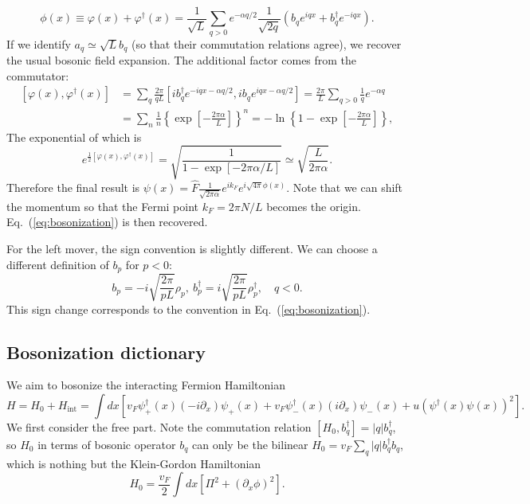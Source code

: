 \documentclass[aps,prb,superscriptaddress,nofootinbib]{revtex4}
\begin{document}
\begin{equation}
	\phi(x) \equiv \varphi(x)+\varphi^\dagger(x)= \frac{1}{\sqrt{L}} \sum_{q>0} e^{-\alpha q/2} \frac{1}{\sqrt{2q}} \left(b_q e^{iqx} + b_q^\dagger e^{-iqx} \right).
\end{equation}
If we identify $a_q \simeq \sqrt{L}b_q$ (so that their commutation relations agree), we recover the usual bosonic field expansion.
The additional factor comes from the commutator:
\begin{equation*}
\begin{aligned}
	\left[\varphi(x),\varphi^\dagger(x)\right] &= \sum_q \frac{2\pi}{qL} [i b_q^\dagger e^{-iqx-\alpha q/2}, i b_q e^{iqx-\alpha q/2}] 
	= \frac{2\pi}{L} \sum_{q>0} \frac{1}{q} e^{-\alpha q} \\
	&= \sum_n \frac{1}{n}\left\{\exp\left[-\frac{2\pi \alpha}{L}\right]\right\}^n
	= -\ln\left\{ 1-\exp\left[-\frac{2\pi \alpha}{L}\right]\right\},
\end{aligned}
\end{equation*}
The exponential of which is
\begin{equation*}
	e^{\frac{1}{2}\left[\varphi(x),\varphi^\dagger(x)\right]} = \sqrt{\frac{1}{1-\exp\left[-2\pi \alpha/L\right]}}
	\simeq \sqrt{\frac{L}{2\pi \alpha}}.
\end{equation*}
Therefore the final result is $\psi(x) = \hat{F} \frac{1}{\sqrt{2\pi \alpha}} e^{ik_F} e^{i\sqrt{4\pi}\phi(x)}$.
Note that we can shift the momentum so that the Fermi point $k_F = 2\pi N/L$ becomes the origin.
Eq.~(\ref{eq:bosonization}) is then recovered.

For the left mover, the sign convention is slightly different.
We can choose a different definition of $b_p$ for $p<0$:
\begin{equation}
	b_p = -i \sqrt{\frac{2\pi}{pL}}\rho_p,\ 
	b_p^\dagger = i\sqrt{\frac{2\pi}{pL}}\rho_p^\dagger,\quad q<0.
\end{equation}
This sign change corresponds to the convention in Eq.~(\ref{eq:bosonization}).


\subsection{Bosonization dictionary}
We aim to bosonize the interacting Fermion Hamiltonian
\begin{equation*}
	H = H_0 + H_\text{int} = \int dx \left[v_F\psi^\dagger_+(x)(-i\partial_x)\psi_+(x) +v_F\psi_-^\dagger(x)(i\partial_x)\psi_-(x) + u(\psi^\dagger(x)\psi(x))^2 \right].
\end{equation*}
We first consider the free part.
Note the commutation relation $[H_0,b_{q}^\dagger] = |q| b_{q}^\dagger$, so $H_0$ in terms of bosonic operator $b_q$ can only be the bilinear $H_0 = v_F \sum_{q} |q| b^\dagger_q b_q$, which is nothing but the Klein-Gordon Hamiltonian 
\begin{equation}
	H_0 = \frac{v_F}{2} \int dx [\Pi^2+(\partial_x\phi)^2].
\end{equation}
\end{document}
